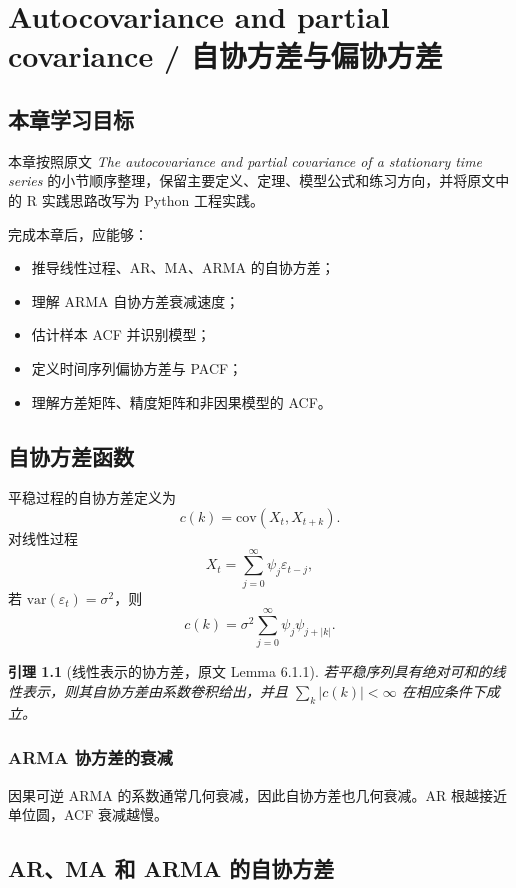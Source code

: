\documentclass[11pt,a4paper,openany]{ctexbook}
\newtheorem{lemma}{引理}[section]
\begin{document}
\chapter{Autocovariance and partial covariance / 自协方差与偏协方差}
\section*{本章学习目标}

本章按照原文 \textit{The autocovariance and partial covariance of a stationary time series} 的小节顺序整理，保留主要定义、定理、模型公式和练习方向，并将原文中的 R 实践思路改写为 Python 工程实践。

完成本章后，应能够：
\begin{itemize}
  \item 推导线性过程、AR、MA、ARMA 的自协方差；
  \item 理解 ARMA 自协方差衰减速度；
  \item 估计样本 ACF 并识别模型；
  \item 定义时间序列偏协方差与 PACF；
  \item 理解方差矩阵、精度矩阵和非因果模型的 ACF。
\end{itemize}

\section{自协方差函数}

平稳过程的自协方差定义为
\[
  c(k)=\mathrm{cov}(X_t,X_{t+k}).
\]
对线性过程
\[
  X_t=\sum_{j=0}^{\infty}\psi_j\varepsilon_{t-j},
\]
若 \(\mathrm{var}(\varepsilon_t)=\sigma^2\)，则
\[
  c(k)=\sigma^2\sum_{j=0}^{\infty}\psi_j\psi_{j+|k|}.
\]

\begin{lemma}[线性表示的协方差，原文 Lemma 6.1.1]
若平稳序列具有绝对可和的线性表示，则其自协方差由系数卷积给出，并且 \(\sum_k|c(k)|<\infty\) 在相应条件下成立。
\end{lemma}

\subsection{ARMA 协方差的衰减}

因果可逆 ARMA 的系数通常几何衰减，因此自协方差也几何衰减。AR 根越接近单位圆，ACF 衰减越慢。

\section{AR、MA 和 ARMA 的自协方差}
\end{document}
